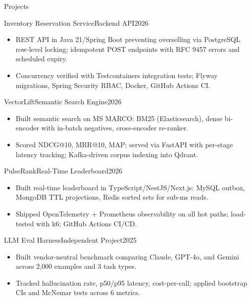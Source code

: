 \documentclass[]{mcdowellcv}
\begin{document}
\begin{cvsection}{Projects}
  \begin{cvsubsection}{Inventory Reservation Service}{Backend API}{2026}
    \begin{itemize}
      \item REST API in Java 21/Spring Boot preventing overselling via PostgreSQL row-level locking; idempotent POST endpoints with RFC 9457 errors and scheduled expiry.
      \item Concurrency verified with Testcontainers integration tests; Flyway migrations, Spring Security RBAC, Docker, GitHub Actions CI.
    \end{itemize}
    \vspace{-1.5pt}
  \end{cvsubsection}

  \begin{cvsubsection}{VectorLift}{Semantic Search Engine}{2026}
    \begin{itemize}
      \item Built semantic search on MS MARCO: BM25 (Elasticsearch), dense bi-encoder with in-batch negatives, cross-encoder re-ranker.
      \item Scored NDCG@10, MRR@10, MAP; served via FastAPI with per-stage latency tracking; Kafka-driven corpus indexing into Qdrant.
    \end{itemize}
    \vspace{-1.5pt}
  \end{cvsubsection}

  \begin{cvsubsection}{PulseRank}{Real-Time Leaderboard}{2026}
    \begin{itemize}
      \item Built real-time leaderboard in TypeScript/NestJS/Next.js: MySQL outbox, MongoDB TTL projections, Redis sorted sets for sub-ms reads.
      \item Shipped OpenTelemetry + Prometheus observability on all hot paths; load-tested with k6; GitHub Actions CI/CD.
    \end{itemize}
    \vspace{-1.5pt}
  \end{cvsubsection}

  \begin{cvsubsection}{LLM Eval Harness}{Independent Project}{2025}
    \begin{itemize}
      \item Built vendor-neutral benchmark comparing Claude, GPT-4o, and Gemini across 2,000 examples and 3 task types.
      \item Tracked hallucination rate, p50/p95 latency, cost-per-call; applied bootstrap CIs and McNemar tests across 6 metrics.
    \end{itemize}
  \end{cvsubsection}
\end{cvsection}
\end{document}
